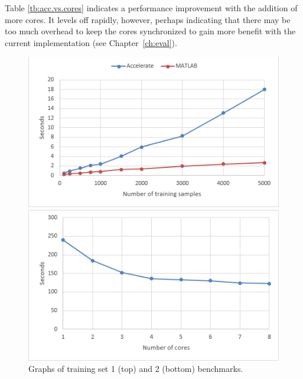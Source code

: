 \begin{table}
\centering
{}
	\caption{Benchmarking training set 2.}
	\label{tb:acc.vs.cores}
\end{table}

Table \ref{tb:acc.vs.cores} indicates a performance improvement with the addition of more cores. It levels off rapidly, however, perhaps indicating that there may be too much overhead to keep the cores synchronized to gain more benefit with the current implementation (see Chapter~\ref{ch:eval}).

\begin{figure}
\centerline
	{\includegraphics[scale=0.7]{training1.png}}
\centerline	
	{\includegraphics[scale=0.7]{training2.png}}
	\caption{Graphs of training set 1 (top) and 2 (bottom) benchmarks.}
	\label{fig:traininggraphs}
\end{figure}
